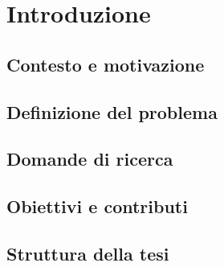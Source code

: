 \chapter{Introduzione}
\label{cap:introduzione}


\section{Contesto e motivazione}
\label{sec:contesto}

\section{Definizione del problema}
\label{sec:problema}

\section{Domande di ricerca}
\label{sec:domande-ricerca}

\section{Obiettivi e contributi}
\label{sec:obiettivi}

\section{Struttura della tesi}
\label{sec:struttura}
